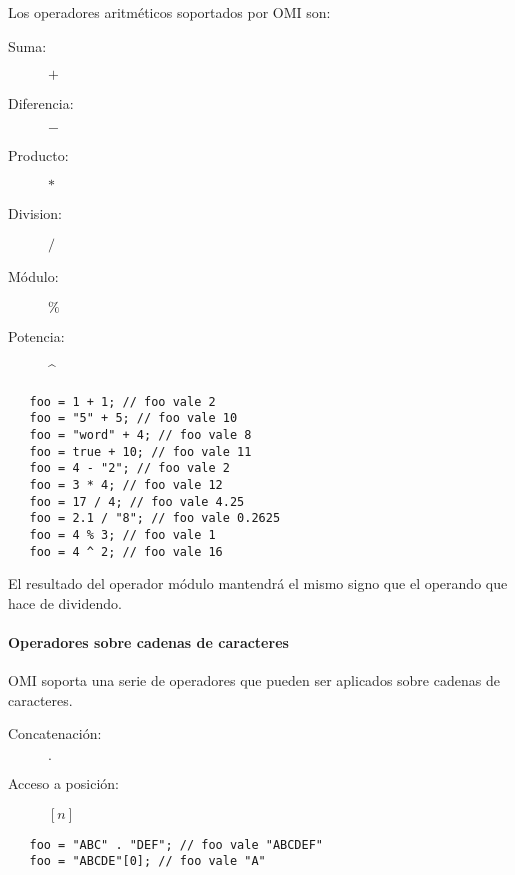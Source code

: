 Los operadores aritméticos soportados por OMI son:

\begin{description}
\item [Suma:] $+$
\item [Diferencia:] $-$
\item [Producto:] $*$
\item [Division:] $/$
\item [Módulo:] $\%$
\item [Potencia:] \^ \hfill   
\end{description} 


\begin{lstlisting}
   foo = 1 + 1; // foo vale 2
   foo = "5" + 5; // foo vale 10
   foo = "word" + 4; // foo vale 8
   foo = true + 10; // foo vale 11
   foo = 4 - "2"; // foo vale 2
   foo = 3 * 4; // foo vale 12
   foo = 17 / 4; // foo vale 4.25
   foo = 2.1 / "8"; // foo vale 0.2625
   foo = 4 % 3; // foo vale 1
   foo = 4 ^ 2; // foo vale 16 
\end{lstlisting} 

El resultado del operador módulo mantendrá el mismo signo que el operando que hace de dividendo.




\paragraph{Operadores sobre cadenas de caracteres}\label{sec:op_string}
OMI soporta una serie de operadores que pueden ser aplicados sobre cadenas de caracteres. 

\begin{description}
\item [Concatenación:] $.$
\item [Acceso a posición:] $[n]$
\end{description} 

\begin{lstlisting}
   foo = "ABC" . "DEF"; // foo vale "ABCDEF"
   foo = "ABCDE"[0]; // foo vale "A"
\end{lstlisting} 

